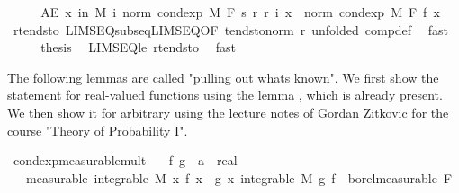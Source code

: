 \begin{isabellebody}
\ \ \isamarkupfalse%
\ \isamarkupfalse%
\ {\isachardoublequoteopen}AE\ x\ in\ M{\isachardot}{\kern0pt}\ {\isacharparenleft}{\kern0pt}{\isasymlambda}i{\isachardot}{\kern0pt}\ norm\ {\isacharparenleft}{\kern0pt}cond{\isacharunderscore}{\kern0pt}exp\ M\ F\ {\isacharparenleft}{\kern0pt}s\ {\isacharparenleft}{\kern0pt}r\ {\isacharparenleft}{\kern0pt}r{\isacharprime}{\kern0pt}\ i{\isacharparenright}{\kern0pt}{\isacharparenright}{\kern0pt}{\isacharparenright}{\kern0pt}\ x{\isacharparenright}{\kern0pt}{\isacharparenright}{\kern0pt}\ {\isasymlonglonglongrightarrow}\ norm\ {\isacharparenleft}{\kern0pt}cond{\isacharunderscore}{\kern0pt}exp\ M\ F\ f\ x{\isacharparenright}{\kern0pt}{\isachardoublequoteclose}\ \isamarkupfalse%
\ r{\isacharunderscore}{\kern0pt}tendsto\ LIMSEQ{\isacharunderscore}{\kern0pt}subseq{\isacharunderscore}{\kern0pt}LIMSEQ{\isacharbrackleft}{\kern0pt}OF\ tendsto{\isacharunderscore}{\kern0pt}norm\ r{\isacharprime}{\kern0pt}{\isacharcomma}{\kern0pt}\ unfolded\ comp{\isacharunderscore}{\kern0pt}def{\isacharbrackright}{\kern0pt}\ \isamarkupfalse%
\ fast\isanewline
\ \ \isamarkupfalse%
\ \isamarkupfalse%
\ {\isacharquery}{\kern0pt}thesis\ \isamarkupfalse%
\ LIMSEQ{\isacharunderscore}{\kern0pt}le\ r{\isacharprime}{\kern0pt}{\isacharunderscore}{\kern0pt}tendsto\ \isamarkupfalse%
\ fast\isanewline
{}\isamarkupfalse%
%
\endisatagproof
{\isafoldproof}%
%
\isadelimproof
%
\endisadelimproof
%
\begin{isamarkuptext}%
The following lemmas are called "pulling out whats known". We first show the statement for real-valued functions using the lemma , which is already present.
      We then show it for arbitrary  using the lecture notes of Gordan Zitkovic for the course "Theory of Probability I".%
\end{isamarkuptext}\isamarkuptrue%
\isamarkupfalse%
\ cond{\isacharunderscore}{\kern0pt}exp{\isacharunderscore}{\kern0pt}measurable{\isacharunderscore}{\kern0pt}mult{\isacharcolon}{\kern0pt}\isanewline
\ \ \ f\ g\ {\isacharcolon}{\kern0pt}{\isacharcolon}{\kern0pt}\ {\isachardoublequoteopen}{\isacharprime}{\kern0pt}a\ {\isasymRightarrow}\ real{\isachardoublequoteclose}\isanewline
\ \ \ {\isacharbrackleft}{\kern0pt}measurable{\isacharbrackright}{\kern0pt}{\isacharcolon}{\kern0pt}\ {\isachardoublequoteopen}integrable\ M\ {\isacharparenleft}{\kern0pt}{\isasymlambda}x{\isachardot}{\kern0pt}\ f\ x\ {\isacharasterisk}{\kern0pt}\ g\ x{\isacharparenright}{\kern0pt}{\isachardoublequoteclose}\ {\isachardoublequoteopen}integrable\ M\ g{\isachardoublequoteclose}\ {\isachardoublequoteopen}f\ {\isasymin}\ borel{\isacharunderscore}{\kern0pt}measurable\ F{\isachardoublequoteclose}\ \isanewline

\end{isabellebody}

